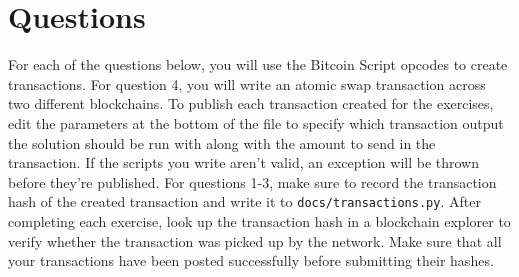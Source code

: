 \documentclass[11pt]{article}
\begin{document}
\section{Questions}
For each of the questions below, you will use the Bitcoin Script opcodes to create transactions. For question 4, you will write an atomic swap transaction across two different blockchains. To publish each transaction created for the exercises, edit the parameters at the bottom of the file to specify which transaction output the solution should be run with along with the amount to send in the transaction. If the scripts you write aren't valid, an exception will be thrown before they're published. For questions 1-3, make sure to record the transaction hash of the created transaction and write it to \texttt{docs/transactions.py}. After completing each exercise, look up the transaction hash in a blockchain explorer to verify whether the transaction was picked up by the network. Make sure that all your transactions have been posted successfully before submitting their hashes.
\end{document}

